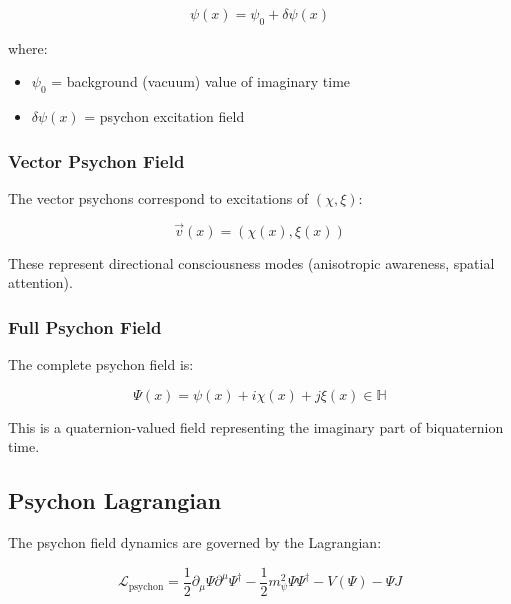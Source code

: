 \begin{equation}
\label{eq:canonical:psychon_scalar}
\psi(x) = \psi_0 + \delta\psi(x)
\end{equation}

where:
\begin{itemize}
    \item $\psi_0$ = background (vacuum) value of imaginary time
    \item $\delta\psi(x)$ = psychon excitation field
\end{itemize}

\subsubsection{Vector Psychon Field}

The vector psychons correspond to excitations of $(\chi, \xi)$:

\begin{equation}
\label{eq:canonical:psychon_vector}
\vec{v}(x) = (\chi(x), \xi(x))
\end{equation}

These represent directional consciousness modes (anisotropic awareness, spatial attention).

\subsubsection{Full Psychon Field}

The complete psychon field is:

\begin{equation}
\label{eq:canonical:psychon_full}
\Psi(x) = \psi(x) + i\chi(x) + j\xi(x) \in \mathbb{H}
\end{equation}

This is a quaternion-valued field representing the imaginary part of biquaternion time.

\subsection{Psychon Lagrangian}

The psychon field dynamics are governed by the Lagrangian:

\begin{equation}
\label{eq:canonical:psychon_lagrangian}
\mathcal{L}_{\text{psychon}} = \frac{1}{2} \partial_\mu \Psi \partial^\mu \Psi^\dagger - \frac{1}{2} m_\psi^2 \Psi \Psi^\dagger - V(\Psi) - \Psi J
\end{equation}

